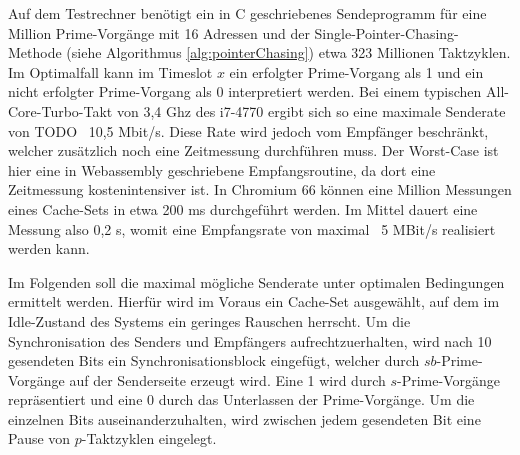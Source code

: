 Auf dem Testrechner benötigt ein in C geschriebenes Sendeprogramm für eine Million Prime-Vorgänge mit 16 Adressen und der Single-Pointer-Chasing-Methode  (siehe Algorithmus \ref{alg:pointerChasing}) etwa 323 Millionen Taktzyklen.
Im Optimalfall kann im Timeslot $x$ ein erfolgter Prime-Vorgang als 1 und ein nicht erfolgter Prime-Vorgang  als 0 interpretiert werden.
Bei einem typischen All-Core-Turbo-Takt von 3,4 Ghz des i7-4770 ergibt sich so eine maximale Senderate von TODO ~10,5 Mbit/s.
Diese Rate wird jedoch vom Empfänger beschränkt, welcher zusätzlich noch eine Zeitmessung durchführen muss. Der Worst-Case ist hier eine in Webassembly geschriebene Empfangsroutine, da dort eine Zeitmessung kostenintensiver ist. In Chromium 66 können eine Million Messungen eines Cache-Sets in etwa 200 ms durchgeführt werden. Im Mittel dauert eine Messung also 0,2 \textmu s, womit eine Empfangsrate von maximal ~5 MBit/s realisiert werden kann.

Im Folgenden soll die maximal mögliche Senderate unter optimalen Bedingungen ermittelt werden. 
Hierfür wird im Voraus ein Cache-Set ausgewählt, auf dem im Idle-Zustand des Systems ein geringes Rauschen herrscht.
Um die Synchronisation des Senders und Empfängers aufrechtzuerhalten, wird nach 10 gesendeten Bits ein Synchronisationsblock eingefügt, welcher durch $sb$-Prime-Vorgänge auf der Senderseite erzeugt wird. 
Eine 1 wird durch $s$-Prime-Vorgänge repräsentiert und eine 0 durch das Unterlassen der Prime-Vorgänge. 
Um die einzelnen Bits auseinanderzuhalten, wird zwischen jedem gesendeten Bit eine Pause von $p$-Taktzyklen eingelegt. 






\newtext




\newtextend


